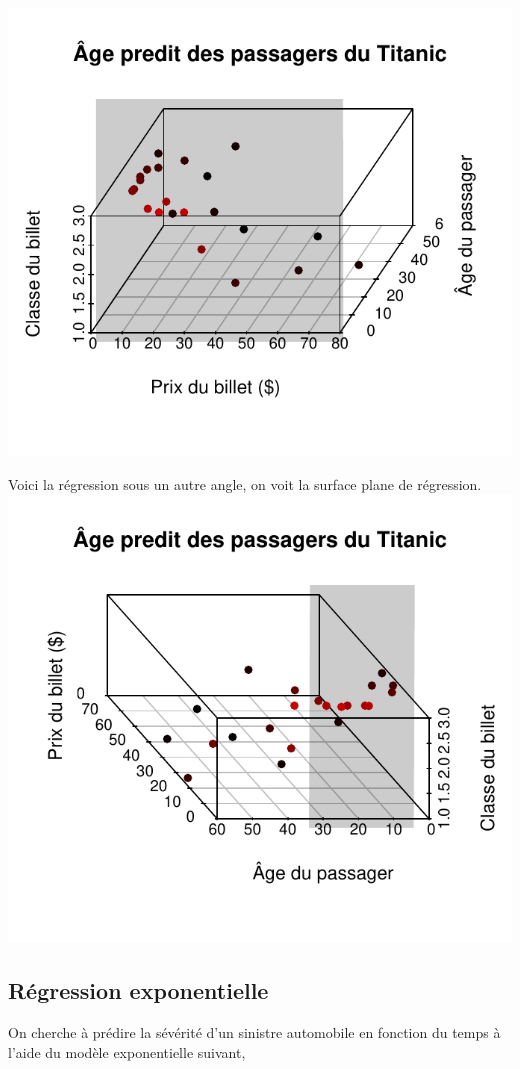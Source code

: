 \documentclass[11pt,french]{report}
\begin{document}
\includegraphics{notes_de_cours-002}


Voici la régression sous un autre angle, on voit la surface plane de régression.
\includegraphics{notes_de_cours-003}



\subsection{Régression exponentielle}
On cherche à prédire la sévérité d'un sinistre automobile en fonction du temps à l'aide du modèle exponentielle suivant,
\end{document}
